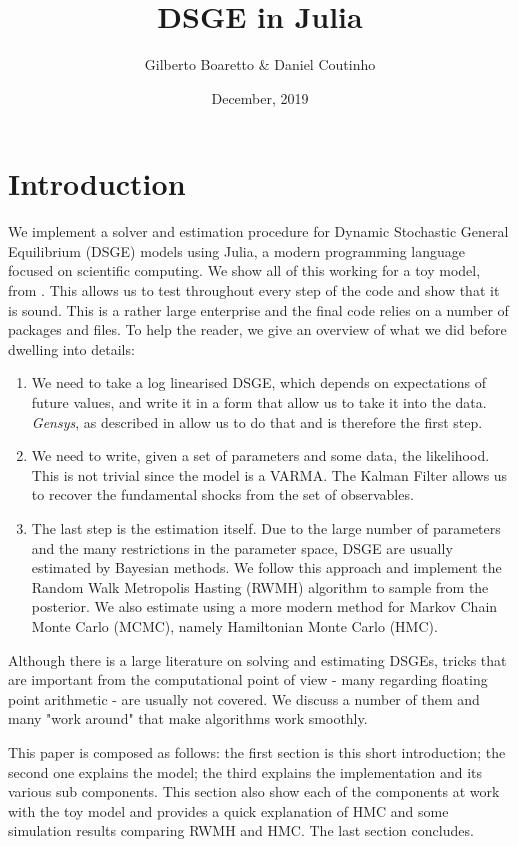 \documentclass[12pt,a4paper]{article}
\title{ DSGE in Julia }
\author{ Gilberto Boaretto \& Daniel Coutinho }
\date{ December, 2019 }
\begin{document}
\maketitle

\section{Introduction}
We implement a solver and estimation procedure for Dynamic Stochastic General Equilibrium (DSGE) models using Julia, a modern programming language focused on scientific computing. We show all of this working for a toy model, from \cite{Gali2009}. This allows us to test throughout every step of the code and show that it is sound. This is a rather large enterprise and the final code relies on a number of packages and files. To help the reader, we give an overview of what we did before dwelling into details:

\begin{enumerate}
\item We need to take a log linearised DSGE, which depends on expectations of future values, and write it in a form that allow us to take it into the data. \emph{Gensys}, as described in \cite{Sims2002} allow us to do that and is therefore the first step.


\item We need to write, given a set of parameters and some data, the likelihood. This is not trivial since the model is a VARMA. The Kalman Filter allows us to recover the fundamental shocks from the set of observables.


\item The last step is the estimation itself. Due to the large number of parameters and the many restrictions in the parameter space, DSGE are usually estimated by Bayesian methods. We follow this approach and implement the Random Walk Metropolis Hasting (RWMH) algorithm to sample from the posterior. We also estimate using a more modern method for Markov Chain Monte Carlo (MCMC), namely Hamiltonian Monte Carlo (HMC).

\end{enumerate}

Although there is a large literature on solving and estimating DSGEs, tricks that are important from the computational point of view - many regarding floating point arithmetic - are usually not covered. We discuss a number of them and many "work around" that make algorithms work smoothly.

This paper is composed as follows: the first section is this short introduction; the second one explains the model; the third explains the implementation and its various sub components. This section also show each of the components at work with the toy model and provides a quick explanation of HMC and some simulation results comparing RWMH and HMC. The last section concludes.
\end{document}
